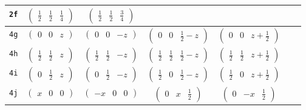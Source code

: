 \documentclass[fleqn,9pt,landscape]{jsarticle}
\begin{document}
\begin{center}
\begin{longtable}{ccccccc}
{\tt 2f} & $ \begin{pmatrix} \frac{1}{2} & \frac{1}{2} & \frac{1}{4} \end{pmatrix} $ & $ \begin{pmatrix} \frac{1}{2} & \frac{1}{2} & \frac{3}{4} \end{pmatrix} $ & $  $ & $  $ & $  $ & $  $ \\ \hline
{\tt 4g} & $ \begin{pmatrix} 0 & 0 & z \end{pmatrix} $ & $ \begin{pmatrix} 0 & 0 & - z \end{pmatrix} $ & $ \begin{pmatrix} 0 & 0 & \frac{1}{2} - z \end{pmatrix} $ & $ \begin{pmatrix} 0 & 0 & z + \frac{1}{2} \end{pmatrix} $ & $  $ & $  $ \\ \hline
{\tt 4h} & $ \begin{pmatrix} \frac{1}{2} & \frac{1}{2} & z \end{pmatrix} $ & $ \begin{pmatrix} \frac{1}{2} & \frac{1}{2} & - z \end{pmatrix} $ & $ \begin{pmatrix} \frac{1}{2} & \frac{1}{2} & \frac{1}{2} - z \end{pmatrix} $ & $ \begin{pmatrix} \frac{1}{2} & \frac{1}{2} & z + \frac{1}{2} \end{pmatrix} $ & $  $ & $  $ \\ \hline
{\tt 4i} & $ \begin{pmatrix} 0 & \frac{1}{2} & z \end{pmatrix} $ & $ \begin{pmatrix} 0 & \frac{1}{2} & - z \end{pmatrix} $ & $ \begin{pmatrix} \frac{1}{2} & 0 & \frac{1}{2} - z \end{pmatrix} $ & $ \begin{pmatrix} \frac{1}{2} & 0 & z + \frac{1}{2} \end{pmatrix} $ & $  $ & $  $ \\ \hline
{\tt 4j} & $ \begin{pmatrix} x & 0 & 0 \end{pmatrix} $ & $ \begin{pmatrix} - x & 0 & 0 \end{pmatrix} $ & $ \begin{pmatrix} 0 & x & \frac{1}{2} \end{pmatrix} $ & $ \begin{pmatrix} 0 & - x & \frac{1}{2} \end{pmatrix} $ & $  $ & $  $ \\ \hline

\end{longtable}
\end{center}
\end{document}
